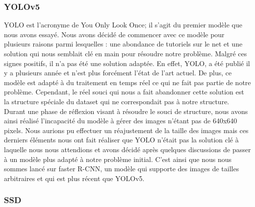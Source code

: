 \subsubsection{YOLOv5}
YOLO est l'acronyme de You Only Look Once; il s'agit du premier modèle que nous avons essayé. Nous avons décidé de commencer avec ce modèle pour plusieurs raisons parmi lesquelles : une abondance de tutoriels sur le net et une solution qui nous semblait clé en main pour résoudre notre problème. Malgré ces signes positifs, il n’a pas été une solution adaptée. \newline
En effet, YOLO, a été publié il y a plusieurs année et n’est plus forcément l’état de l’art actuel. De plus, ce modèle est adapté à du traitement en temps réel ce qui ne fait pas partie de notre problème. Cependant, le réel souci qui nous a fait abandonner cette solution est la structure spéciale du dataset qui ne correspondait pas à notre structure. \newline 
Durant une phase de réflexion visant à résoudre le souci de structure, nous avons ainsi réalisé l’incapacité du modèle à gérer des images n’étant pas de 640x640 pixels. Nous aurions pu effectuer un réajustement de la taille des images mais ces derniers éléments nous ont fait réaliser que YOLO n’était pas la solution clé à laquelle nous nous attendions et avons décidé après quelques discussions de passer à un modèle plus adapté à notre problème initial. C'est ainsi que nous nous sommes lancé sur faster R-CNN, un modèle qui supporte des images de tailles arbitraires et qui est plus récent que YOLOv5.

\subsubsection{SSD}

